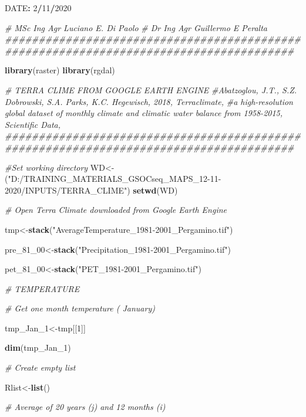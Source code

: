 \documentclass[
  10pt,
  b5paper,
]{book}
\newenvironment{Shaded}{\begin{snugshade}}{\end{snugshade}}
\newcommand{\CommentTok}[1]{\textcolor[rgb]{0.56,0.35,0.01}{\textit{#1}}}
\newcommand{\DecValTok}[1]{\textcolor[rgb]{0.00,0.00,0.81}{#1}}
\newcommand{\KeywordTok}[1]{\textcolor[rgb]{0.13,0.29,0.53}{\textbf{#1}}}
\newcommand{\NormalTok}[1]{#1}
\newcommand{\OperatorTok}[1]{\textcolor[rgb]{0.81,0.36,0.00}{\textbf{#1}}}
\newcommand{\StringTok}[1]{\textcolor[rgb]{0.31,0.60,0.02}{#1}}
\begin{document}
\begin{Shaded}
\begin{Highlighting}[]
\NormalTok{DATE}\OperatorTok{:}\StringTok{  }\DecValTok{2}\OperatorTok{/}\DecValTok{11}\OperatorTok{/}\DecValTok{2020}

\CommentTok{#  MSc Ing Agr Luciano E. Di Paolo}
\CommentTok{#  Dr Ing Agr Guillermo E Peralta}
\CommentTok{#######################################################################################}

\KeywordTok{library}\NormalTok{(raster)}
\KeywordTok{library}\NormalTok{(rgdal)}


\CommentTok{# TERRA CLIME FROM GOOGLE EARTH ENGINE}
\CommentTok{#Abatzoglou, J.T., S.Z. Dobrowski, S.A. Parks, K.C. Hegewisch, 2018, Terraclimate, }
\CommentTok{#a high-resolution global dataset of monthly climate and climatic water balance from 1958-2015, Scientific Data,}
\CommentTok{#######################################################################################}

\CommentTok{#Set working directory}
\NormalTok{WD<-(}\StringTok{"D:/TRAINING_MATERIALS_GSOCseq_MAPS_12-11-2020/INPUTS/TERRA_CLIME"}\NormalTok{)}
\KeywordTok{setwd}\NormalTok{(WD)}


\CommentTok{# Open Terra Climate downloaded from Google Earth Engine}

\NormalTok{tmp<-}\KeywordTok{stack}\NormalTok{(}\StringTok{"AverageTemperature_1981-2001_Pergamino.tif"}\NormalTok{)}

\NormalTok{pre_}\DecValTok{81}\NormalTok{_}\DecValTok{00}\NormalTok{<-}\KeywordTok{stack}\NormalTok{(}\StringTok{"Precipitation_1981-2001_Pergamino.tif"}\NormalTok{)}

\NormalTok{pet_}\DecValTok{81}\NormalTok{_}\DecValTok{00}\NormalTok{<-}\KeywordTok{stack}\NormalTok{(}\StringTok{"PET_1981-2001_Pergamino.tif"}\NormalTok{)}


\CommentTok{# TEMPERATURE}

\CommentTok{# Get one month temperature ( January)}

\NormalTok{tmp_Jan_}\DecValTok{1}\NormalTok{<-tmp[[}\DecValTok{1}\NormalTok{]]}

\KeywordTok{dim}\NormalTok{(tmp_Jan_}\DecValTok{1}\NormalTok{)}

\CommentTok{# Create empty list}

\NormalTok{Rlist<-}\KeywordTok{list}\NormalTok{()}

\CommentTok{# Average of 20 years (j)  and 12 months (i) }


\end{Highlighting}
\end{Shaded}
\end{document}
